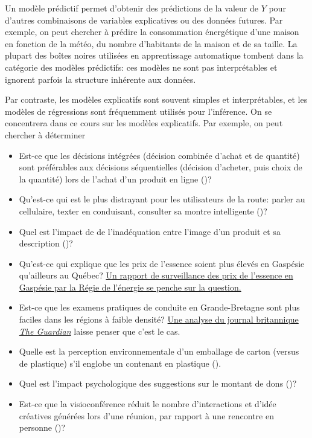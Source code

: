 \documentclass[
  11pt,
  letterpaper,
]{scrbook}
\providecommand{\tightlist}{%
  \setlength{\itemsep}{0pt}\setlength{\parskip}{0pt}}\usepackage{longtable,booktabs,array}
\theoremstyle{definition}
\theoremstyle{definition}
\theoremstyle{remark}
\begin{document}
Un modèle prédictif permet d'obtenir des prédictions de la valeur de
\(Y\) pour d'autres combinaisons de variables explicatives ou des
données futures. Par exemple, on peut chercher à prédire la consommation
énergétique d'une maison en fonction de la météo, du nombre d'habitants
de la maison et de sa taille. La plupart des boîtes noires utilisées en
apprentissage automatique tombent dans la catégorie des modèles
prédictifs: ces modèles ne sont pas interprétables et ignorent parfois
la structure inhérente aux données.

Par contraste, les modèles explicatifs sont souvent simples et
interprétables, et les modèles de régressions sont fréquemment utilisés
pour l'inférence. On se concentrera dans ce cours sur les modèles
explicatifs. Par exemple, on peut chercher à déterminer

\begin{itemize}
\tightlist
\item
  Est-ce que les décisions intégrées (décision combinée d'achat et de
  quantité) sont préférables aux décisions séquentielles (décision
  d'acheter, puis choix de la quantité) lors de l'achat d'un produit en
  ligne ()?
\item
  Qu'est-ce qui est le plus distrayant pour les utilisateurs de la
  route: parler au cellulaire, texter en conduisant, consulter sa montre
  intelligente ()?
\item
  Quel est l'impact de de l'inadéquation entre l'image d'un produit et
  sa description ()?
\item
  Qu'est-ce qui explique que les prix de l'essence soient plus élevés en
  Gaspésie qu'ailleurs au Québec?
  \href{http://www.regie-energie.qc.ca/energie/rapports/Rapport_PrixGasp\%C3\%A9sie_20191219.pdf}{Un
  rapport de surveillance des prix de l'essence en Gaspésie par la Régie
  de l'énergie se penche sur la question.}
\item
  Est-ce que les examens pratiques de conduite en Grande-Bretagne sont
  plus faciles dans les régions à faible densité?
  \href{https://www.theguardian.com/world/2019/aug/23/an-easy-ride-scottish-village-fuels-debate-driving-test-pass-rates}{Une
  analyse du journal britannique \emph{The Guardian}} laisse penser que
  c'est le cas.
\item
  Quelle est la perception environnementale d'un emballage de carton
  (versus de plastique) s'il englobe un contenant en plastique
  ().
\item
  Quel est l'impact psychologique des suggestions sur le montant de dons
  ()?
\item
  Est-ce que la visioconférence réduit le nombre d'interactions et
  d'idée créatives générées lors d'une réunion, par rapport à une
  rencontre en personne ()?
\end{itemize}
\end{document}
